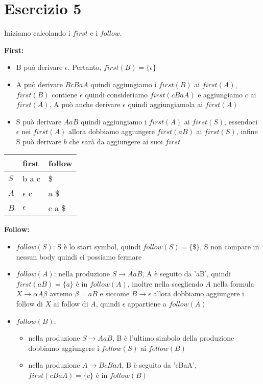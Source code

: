 \documentclass[11pt]{article}
\begin{document}
\section*{Esercizio 5}
Iniziamo calcolando i $first$ e i $follow$.
\begin{multicols}{2}
\noindent\textbf{First:}
\begin{itemize}
  \item B può derivare $\epsilon$. Pertanto, $first(B) = \{\epsilon\}$
  \item A può derivare $BcBaA$ quindi aggiungiamo i $first(B)$ ai $first(A)$, $first(B)$ contiene $\epsilon$
  quindi consideriamo $first(cBaA)$ e aggiungiamo $c$ ai $first(A)$,
  A può anche derivare $\epsilon$ quindi aggiungiamola ai $first(A)$
  \item S può derivare $AaB$ quindi aggiungiamo i $first(A)$ ai $first(S)$,
  essendoci $\epsilon$ nei $first(A)$ allora dobbiamo aggiungere $first(aB)$ ai $first(S)$, infine S può derivare $b$ che sarà da aggiungere ai suoi $first$ 
\end{itemize}
\begin{table}[H]  
  \centering
  \begin{tabularx}{\linewidth}{|>{\centering\arraybackslash}X|>{\centering\arraybackslash}X|>{\centering\arraybackslash}X|}
    \hline
    & first & follow  \\
    \hline
    $S$ & b a c & \$ \\
    \hline
    $A$ & $\epsilon$ c & a \$ \\
    \hline
    $B$ & $\epsilon$ & c a \$ \\
    \hline
  \end{tabularx}
  \label{tab:05-first-follow}
\end{table}
\textbf{Follow:} 
\begin{itemize}
  \item $follow(S)$: S è lo start symbol, quindi $follow(S) = \{\$\}$, S non compare in nessun body quindi ci possiamo fermare
  \item $follow(A)$: nella produzione $S \to AaB$, A è seguito da 'aB', quindi $first(aB) = \{a\}$ è in $follow(A)$, inoltre nella scegliendo $A$ nella formula $X \to \alpha A \beta$ avremo $\beta = aB$ e siccome $B \to \epsilon$ allora dobbiamo aggiungere i follow di $X$ ai follow di $A$, quindi $\epsilon$ appartiene a $follow(A)$
  \item $follow(B)$:
  \begin{itemize}
    \item nella produzione $S \to AaB$, B è l'ultimo simbolo della produzione dobbiamo aggiungere i $follow(S)$ ai $follow(B)$
    \item nella produzione $A \to BcBaA$, B è seguito da 'cBaA', $first(cBaA) = \{c\}$ è in $follow(B)$
  \end{itemize} 
\end{itemize}
\end{multicols}
\end{document}

